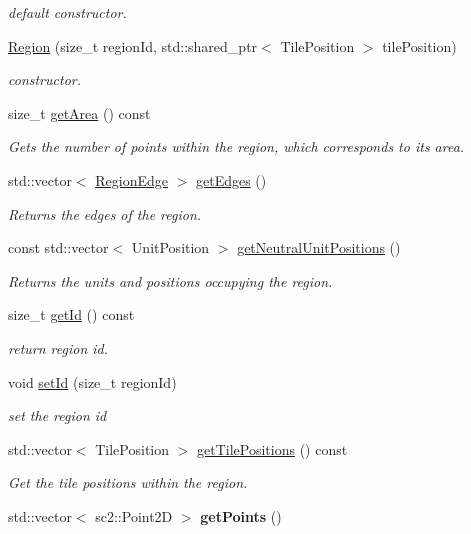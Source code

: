 \begin{DoxyCompactItemize}
\begin{DoxyCompactList}\small\item\em default constructor. \end{DoxyCompactList}\item 
\hyperlink{classOverseer_1_1Region_a8de3309b915589c86745a73c157d4a9f}{Region} (size\+\_\+t region\+Id, std\+::shared\+\_\+ptr$<$ Tile\+Position $>$ tile\+Position)
\begin{DoxyCompactList}\small\item\em constructor. \end{DoxyCompactList}\item 
size\+\_\+t \hyperlink{classOverseer_1_1Region_af4f0876669c6698a728bb84a0d13ff8d}{get\+Area} () const 
\begin{DoxyCompactList}\small\item\em Gets the number of points within the region, which corresponds to it\textquotesingle{}s area. \end{DoxyCompactList}\item 
std\+::vector$<$ \hyperlink{classOverseer_1_1RegionEdge}{Region\+Edge} $>$ \hyperlink{classOverseer_1_1Region_a5564e0d776a0b131476467d08d5b6ec3}{get\+Edges} ()
\begin{DoxyCompactList}\small\item\em Returns the edges of the region. \end{DoxyCompactList}\item 
const std\+::vector$<$ Unit\+Position $>$ \hyperlink{classOverseer_1_1Region_ad3e982a374102f10d1e109231f945d18}{get\+Neutral\+Unit\+Positions} ()
\begin{DoxyCompactList}\small\item\em Returns the units and positions occupying the region. \end{DoxyCompactList}\item 
size\+\_\+t \hyperlink{classOverseer_1_1Region_a57d131cc0afadfb9a1292471cb9477a5}{get\+Id} () const 
\begin{DoxyCompactList}\small\item\em return region id. \end{DoxyCompactList}\item 
void \hyperlink{classOverseer_1_1Region_a52fa1e6684d036d9f2761ec4cf85cd62}{set\+Id} (size\+\_\+t region\+Id)
\begin{DoxyCompactList}\small\item\em set the region id \end{DoxyCompactList}\item 
std\+::vector$<$ Tile\+Position $>$ \hyperlink{classOverseer_1_1Region_a1f2394879dc342b7ba9248eabea7258a}{get\+Tile\+Positions} () const 
\begin{DoxyCompactList}\small\item\em Get the tile positions within the region. \end{DoxyCompactList}\item 
std\+::vector$<$ sc2\+::\+Point2D $>$ {\bfseries get\+Points} ()\hypertarget{classOverseer_1_1Region_a0319cac0728db48d38565bf2593a021f}{}\label{classOverseer_1_1Region_a0319cac0728db48d38565bf2593a021f}


\end{DoxyCompactItemize}
